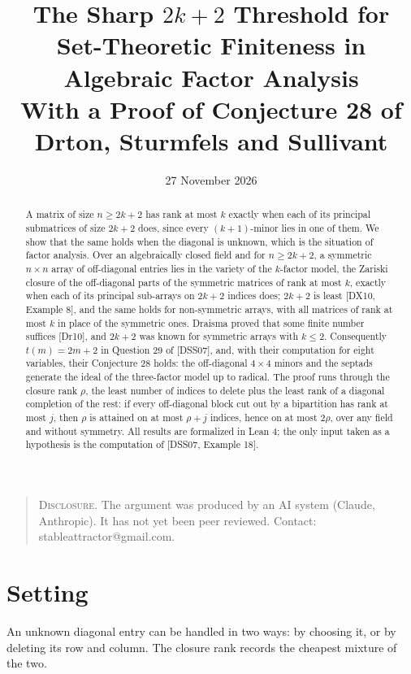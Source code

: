 \documentclass[11pt,letterpaper,reqno]{amsart}
\title[The Sharp $2k+2$ Threshold for Set-Theoretic Finiteness in Algebraic Factor Analysis]{The Sharp $2k+2$ Threshold for Set-Theoretic Finiteness in Algebraic Factor Analysis\\[6pt] {\mdseries\small With a Proof of Conjecture 28 of Drton, Sturmfels and Sullivant}}
\date{27 November 2026}
\theoremstyle{spaced}
\begin{document}
\begin{abstract}
A matrix of size \(n \ge 2k+2\) has rank at most \(k\) exactly when each of its principal submatrices of size \(2k+2\) does, since every \((k+1)\)-minor lies in one of them. We show that the same holds when the diagonal is unknown, which is the situation of factor analysis. Over an algebraically closed field and for \(n \ge 2k+2\), a symmetric \(n \times n\) array of off-diagonal entries lies in the variety of the \(k\)-factor model, the Zariski closure of the off-diagonal parts of the symmetric matrices of rank at most \(k\), exactly when each of its principal sub-arrays on \(2k+2\) indices does; \(2k+2\) is least {[}DX10, Example 8{]}, and the same holds for non-symmetric arrays, with all matrices of rank at most \(k\) in place of the symmetric ones. Draisma proved that some finite number suffices {[}Dr10{]}, and \(2k+2\) was known for symmetric arrays with \(k \le 2\). Consequently \(t(m) = 2m+2\) in Question 29 of {[}DSS07{]}, and, with their computation for eight variables, their Conjecture 28 holds: the off-diagonal \(4 \times 4\) minors and the septads generate the ideal of the three-factor model up to radical. The proof runs through the closure rank \(\rho\), the least number of indices to delete plus the least rank of a diagonal completion of the rest: if every off-diagonal block cut out by a bipartition has rank at most \(j\), then \(\rho\) is attained on at most \(\rho + j\) indices, hence on at most \(2\rho\), over any field and without symmetry. All results are formalized in Lean 4; the only input taken as a hypothesis is the computation of {[}DSS07, Example 18{]}.

\end{abstract}
\maketitle
\begin{quote}\small
\textsc{Disclosure.} The argument was produced by an AI system (Claude, Anthropic). It has not yet been peer reviewed. Contact: stableattractor@gmail.com.

\end{quote}
\smallskip
\hypertarget{setting}{%
\section{Setting}\label{setting}}

An unknown diagonal entry can be handled in two ways: by choosing it, or by deleting its row and column. The closure rank records the cheapest mixture of the two.
\end{document}
